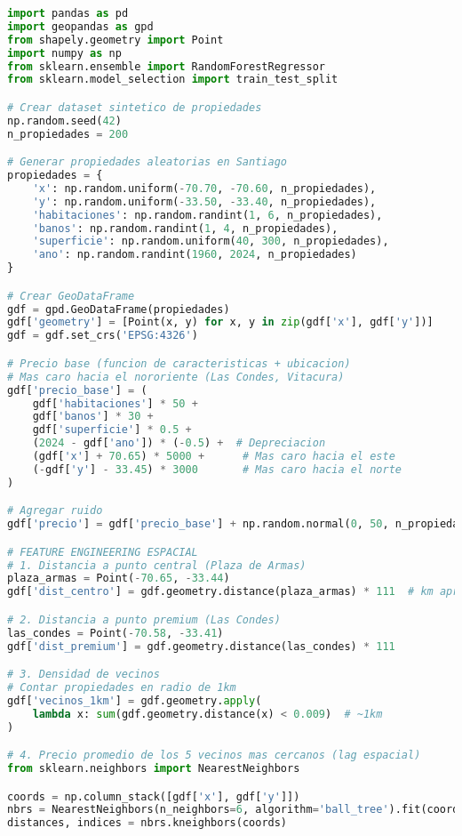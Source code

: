 \documentclass[11pt,a4paper]{article}
\begin{document}
\begin{lstlisting}[language=Python]
import pandas as pd
import geopandas as gpd
from shapely.geometry import Point
import numpy as np
from sklearn.ensemble import RandomForestRegressor
from sklearn.model_selection import train_test_split

# Crear dataset sintetico de propiedades
np.random.seed(42)
n_propiedades = 200

# Generar propiedades aleatorias en Santiago
propiedades = {
    'x': np.random.uniform(-70.70, -70.60, n_propiedades),
    'y': np.random.uniform(-33.50, -33.40, n_propiedades),
    'habitaciones': np.random.randint(1, 6, n_propiedades),
    'banos': np.random.randint(1, 4, n_propiedades),
    'superficie': np.random.uniform(40, 300, n_propiedades),
    'ano': np.random.randint(1960, 2024, n_propiedades)
}

# Crear GeoDataFrame
gdf = gpd.GeoDataFrame(propiedades)
gdf['geometry'] = [Point(x, y) for x, y in zip(gdf['x'], gdf['y'])]
gdf = gdf.set_crs('EPSG:4326')

# Precio base (funcion de caracteristicas + ubicacion)
# Mas caro hacia el nororiente (Las Condes, Vitacura)
gdf['precio_base'] = (
    gdf['habitaciones'] * 50 +
    gdf['banos'] * 30 +
    gdf['superficie'] * 0.5 +
    (2024 - gdf['ano']) * (-0.5) +  # Depreciacion
    (gdf['x'] + 70.65) * 5000 +      # Mas caro hacia el este
    (-gdf['y'] - 33.45) * 3000       # Mas caro hacia el norte
)

# Agregar ruido
gdf['precio'] = gdf['precio_base'] + np.random.normal(0, 50, n_propiedades)

# FEATURE ENGINEERING ESPACIAL
# 1. Distancia a punto central (Plaza de Armas)
plaza_armas = Point(-70.65, -33.44)
gdf['dist_centro'] = gdf.geometry.distance(plaza_armas) * 111  # km aprox

# 2. Distancia a punto premium (Las Condes)
las_condes = Point(-70.58, -33.41)
gdf['dist_premium'] = gdf.geometry.distance(las_condes) * 111

# 3. Densidad de vecinos
# Contar propiedades en radio de 1km
gdf['vecinos_1km'] = gdf.geometry.apply(
    lambda x: sum(gdf.geometry.distance(x) < 0.009)  # ~1km
)

# 4. Precio promedio de los 5 vecinos mas cercanos (lag espacial)
from sklearn.neighbors import NearestNeighbors

coords = np.column_stack([gdf['x'], gdf['y']])
nbrs = NearestNeighbors(n_neighbors=6, algorithm='ball_tree').fit(coords)
distances, indices = nbrs.kneighbors(coords)


\end{lstlisting}
\end{document}
